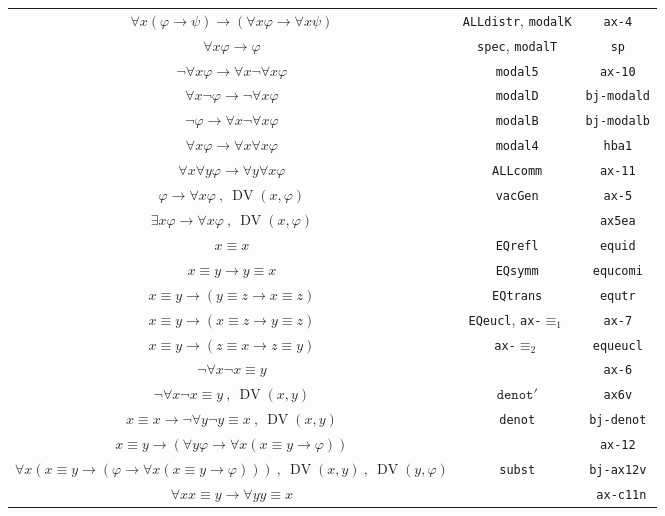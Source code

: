 \documentclass[11pt]{article}
\newcommand*{\comma}{\:,\:}
\renewcommand*{\phi}{\varphi}
\DeclareMathOperator{\DV}{DV}
\theoremstyle{plain}
\theoremstyle{definition}
\theoremstyle{remark}
\begin{document}
\begin{table}[!ht]
\begin{center}
\begin{tabular}{|c|c|c|}
$\forall x (\phi \to \psi) \to (\forall x \phi \to \forall x \psi)$ & \texttt{ALLdistr}, \texttt{modalK} &
\texttt{ax-4}\\
$\forall x \phi \to \phi$ & \texttt{spec}, \texttt{modalT} & \texttt{sp}\\
$\neg \forall x \phi \to \forall x \neg \forall x \phi$ & \texttt{modal5} & \texttt{ax-10}\\
$\forall x \neg \phi \to \neg \forall x \phi$ & \texttt{modalD} & \texttt{bj-modald}\\
$\neg \phi \to \forall x \neg \forall x \phi$ & \texttt{modalB} & \texttt{bj-modalb}\\
$\forall x \phi \to \forall x \forall x \phi$ & \texttt{modal4} & \texttt{hba1}\\
\hline
$\forall x \forall y \phi \to \forall y \forall x \phi$ & \texttt{ALLcomm} & \texttt{ax-11}\\
\hline
$\phi \to \forall x \phi \comma \DV(x, \phi)$ & \texttt{vacGen} & \texttt{ax-5}\\
$\exists x \phi \to \forall x \phi \comma \DV(x, \phi)$ & & \texttt{ax5ea}\\
\hline
$x \equiv x$ & \texttt{EQrefl} & \texttt{equid}\\
$x \equiv y \to y \equiv x$ & \texttt{EQsymm} & \texttt{equcomi}\\
$x \equiv y \to (y \equiv z \to x \equiv z)$ & \texttt{EQtrans} & \texttt{equtr}\\
$x \equiv y \to (x \equiv z \to y \equiv z)$ & \texttt{EQeucl}, \texttt{ax-$\equiv_1$} & \texttt{ax-7}\\
$x \equiv y \to (z \equiv x \to z \equiv y)$ & \texttt{ax-$\equiv_2$} & \texttt{equeucl}\\
\hline
$\neg \forall x \neg x \equiv y$ & & \texttt{ax-6}\\
$\neg \forall x \neg x \equiv y \comma \DV(x, y)$ & $\texttt{denot}'$ & \texttt{ax6v}\\
$x \equiv x \to \neg \forall y \neg y \equiv x \comma \DV(x, y)$ & \texttt{denot}\phantom{'} &
\texttt{bj-denot}\\
\hline
$x \equiv y \to (\forall y \phi \to \forall x (x \equiv y \to \phi))$ & & \texttt{ax-12}\\
$\forall x (x \equiv y \to (\phi \to \forall x (x \equiv y \to \phi)))\comma \DV(x, y)\comma \DV(y, \phi)$
& \texttt{subst} & \texttt{bj-ax12v}\\
\hline
$\forall x x \equiv y \to \forall y y \equiv x$ &  & \texttt{ ax-c11n}\\

\end{tabular}
\end{center}
\end{table}
\end{document}
